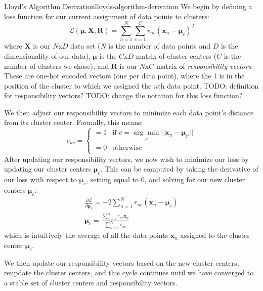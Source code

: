 \begin{derivation}{Lloyd's Algorithm Derivation}{lloyds-algorithm-derivation}
	We begin by defining a loss function for our current assignment of data points to clusters:
	\begin{equation} \label{clustering-loss-fn}
		\mathcal{L}(\boldsymbol{\mu}, \textbf{X}, \textbf{R}) = \sum_{n=1}^{N} \sum_{c=1}^{C} r_{nc} (\textbf{x}_{n} - \boldsymbol{\mu}_{c})^{2}
	\end{equation}
	where $\textbf{X}$ is our $N$x$D$ data set ($N$ is the number of data points and $D$ is the dimensionality of our data), $\boldsymbol{\mu}$ is the $C$x$D$ matrix of cluster centers ($C$ is the number of clusters we chose), and $\textbf{R}$ is our $N$x$C$ matrix of \textit{responsibility vectors}. These are one-hot encoded vectors (one per data point), where the 1 is in the position of the cluster to which we assigned the $n$th data point. TODO: definition for responsibility vectors? TODO: change the notation for this loss function? \newline

	We then adjust our responsibility vectors to minimize each data point's distance from its cluster center. Formally, this means:
	\begin{equation} \label{responsibility-vector-update}
		r_{nc} = \begin{cases}
		 	= 1 & \text{if $c = \underset{c'}{\arg\min} ||\textbf{x}_{n} - \boldsymbol{\mu}_{c'}||$} \\
			= 0 & \text{otherwise} \\
		\end{cases}
	\end{equation}
	After updating our responsibility vectors, we now wish to minimize our loss by updating our cluster centers $\boldsymbol{\mu}_{c}$. This can be computed by taking the derivative of our loss with respect to $\boldsymbol{\mu}_{c}$, setting equal to 0, and solving for our new cluster centers $\boldsymbol{\mu}_{c}$:
	\begin{equation} \label{update-cluster-centers}
		\begin{aligned}
			\frac{\partial \mathcal{L}}{\partial \boldsymbol{\mu}_{c}} = -2 \sum_{n=1}^{N} r_{nc} (\textbf{x}_{n} - \boldsymbol{\mu}_{c}) \\
			\boldsymbol{\mu}_{c} = \frac{\sum_{n=1}^{N} r_{nc} \textbf{x}_{n}}{\sum_{n=1}^{N} r_{nc}}
		\end{aligned}
	\end{equation}
	which is intuitively the average of all the data points $\textbf{x}_{n}$ assigned to the cluster center $\boldsymbol{\mu}_{c}$. \newline

	We then update our responsibility vectors based on the new cluster centers, reupdate the cluster centers, and this cycle continues until we have converged to a stable set of cluster centers and responsibility vectors.
\end{derivation}

